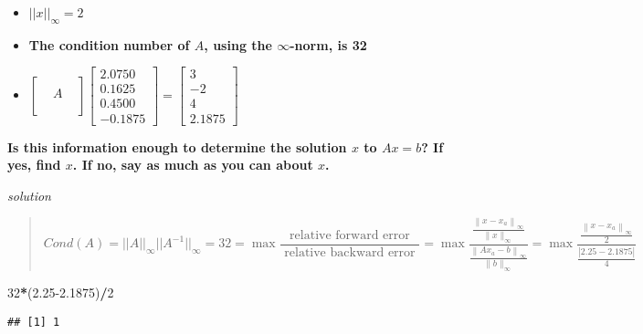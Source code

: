 \documentclass[]{article}
\newenvironment{Shaded}{\begin{snugshade}}{\end{snugshade}}
\newcommand{\DecValTok}[1]{\textcolor[rgb]{0.00,0.00,0.81}{#1}}
\newcommand{\FloatTok}[1]{\textcolor[rgb]{0.00,0.00,0.81}{#1}}
\newcommand{\NormalTok}[1]{#1}
\newcommand{\OperatorTok}[1]{\textcolor[rgb]{0.81,0.36,0.00}{\textbf{#1}}}
\begin{document}
\begin{itemize}
\item
  \(||x||_{\infty}=2\)
\item
  \textbf{The condition number of \(A\), using the \(\infty\)-norm, is
  32}
\item
  \textbf{\(\left[\begin{array}{ccc} && \\ & A & \\ && \\ && \end{array}\right] \left[\begin{array}{r}2.0750 \\ 0.1625 \\ 0.4500 \\ -0.1875 \end{array}\right]=\left[\begin{array}{c}3 \\ -2 \\ 4 \\ 2.1875 \end{array}\right]\)}
\end{itemize}

\textbf{Is this information enough to determine the solution \(x\) to
\(Ax=b\)? If yes, find \(x\). If no, say as much as you can about
\(x\).}

\emph{solution}

\begin{quote}
\[
Cond(A)=||A||_{\infty}||A^{-1}||_{\infty}=32=\max\frac{\text { relative forward error }}{\text { relative backward error }}=\max\frac{\frac{\left\|x-x_{a}\right\|_{\infty}}{\|x\|_{\infty}}}{\frac{\left\|A x_{a}-b\right\|_{\infty}}{\|b\|_{\infty}}}=\max\frac{\frac{\left\|x-x_{a}\right\|_{\infty}}{2}}{\frac{|2.25-2.1875|}{4}}
\]
\end{quote}

\begin{Shaded}
\begin{Highlighting}[]
\DecValTok{32}\OperatorTok{*}\NormalTok{(}\FloatTok{2.25-2.1875}\NormalTok{)}\OperatorTok{/}\DecValTok{2}
\end{Highlighting}
\end{Shaded}

\begin{verbatim}
## [1] 1
\end{verbatim}
\end{document}
